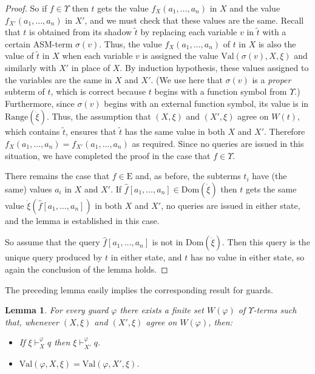 \documentclass{LMCS}
\newtheorem{la}[thm]{Lemma}
\theoremstyle{definition}
\newenvironment{ls}{\begin{itemize}}{\end{itemize}}
\newcommand{\E}{\mathrm{E}}
\newcommand{\U}{\Upsilon}
\newcommand{\ans}{\dot}
\newcommand{\dom}[1]{\ensuremath{{\text{Dom}}(#1)}}
\newcommand{\ran}[1]{\ensuremath{{\text{Range}}(#1)}}
\newcommand{\val}[3]{\ensuremath{\text{Val}(#1,#2,#3)}}
\renewcommand{\phi}{\varphi}
\begin{document}
\begin{proof}
So if $f\in\U$ then $t$ gets the value $f_X(a_1,\dots,a_n)$ in
$X$ and the value $f_{X'}(a_1,\dots,a_n)$ in $X'$, and we must check
that these values are the same.  Recall that $t$ is obtained from its
shadow $\tilde t$ by replacing each variable $v$ in $\tilde t$ with a
certain ASM-term $\sigma(v)$.  Thus, the value $f_X(a_1,\dots,a_n)$ of
$t$ in $X$ is also the value of $\tilde t$ in $X$ when each variable
$v$ is assigned the value $\val{\sigma(v)}X\xi$ and similarly with
$X'$ in place of $X$.  By induction hypothesis, these values assigned
to the variables are the same in $X$ and $X'$.  (We use here that
$\sigma(v)$ is a \emph{proper} subterm of $t$, which is correct
because $t$ begins with a function symbol from $\U$.)
Furthermore, since $\sigma(v)$ begins with an external function
symbol, its value is in \ran{\ans\xi}.  Thus, the assumption that
$(X,\xi)$ and $(X',\xi)$ agree on $W(t)$, which contains $\tilde t$,
ensures that $\tilde t$ has the same value in both $X$ and $X'$.
Therefore $f_X(a_1,\dots,a_n)=f_{X'}(a_1,\dots,a_n)$ as required.
Since no queries are issued in this situation, we have completed the
proof in the case that $f\in\U$.

There remains the case that $f\in\E$ and, as before, the subterms
$t_i$ have (the same) values $a_i$ in $X$ and $X'$.  If $\hat
f[a_1,\dots,a_n]\in\dom{\ans\xi}$ then $t$ gets the same value
$\ans\xi(\hat f[a_1,\dots,a_n])$ in both $X$ and $X'$, no queries are
issued in either state, and the lemma is established in this case.

So assume that the query $\hat f[a_1,\dots,a_n]$ is not in \dom{\ans\xi}.
Then this query is the unique query produced by $t$ in either state,
and $t$ has no value in either state, so again the conclusion of the
lemma holds.
\end{proof}

The preceding lemma easily implies the corresponding result for
guards.

\begin{la}
For every guard $\phi$ there exists a finite set $W(\phi)$ of
$\U$-terms such that, whenever $(X,\xi)$ and $(X',\xi)$ agree on
$W(\phi)$, then:
\begin{ls}
  \item If $\xi\vdash^\phi_Xq$ then $\xi\vdash^\phi_{X'}q$.
  \item $\val\phi X\xi=\val\phi{X'}\xi$.
\end{ls}
\end{la}
\end{document}
